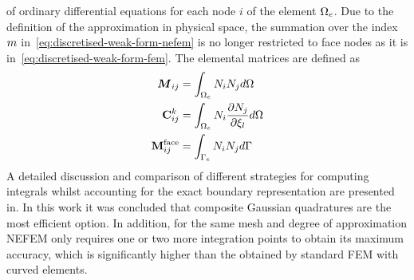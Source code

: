 of ordinary differential equations for each node $i$ of the element $\Omega_e$. Due to the definition of the approximation in physical space, the summation over the index $m$ in~\eqref{eq:discretised-weak-form-nefem} is no longer restricted to face nodes as it is in~\eqref{eq:discretised-weak-form-fem}. The elemental matrices are defined as
\begin{align*}
\boldsymbol{M}_{ij} &= \int_{\Omega_e} N_i N_j d\Omega \\
\mathbf{C}^{k}_{ij} &= 
               \int_{\Omega_e}
               N_i
               \frac{\partial N_j}{\partial \xi_{l}}
               d\Omega \\
\mathbf{M}^{\textrm{face}}_{ij} &= \int_{\Gamma_e} N_i N_j d\Gamma
\end{align*}
A detailed discussion and comparison of different strategies for computing integrals whilst accounting for the exact boundary representation are presented in\cite{DGPaper:38}. In this work it was concluded that composite Gaussian quadratures are the most efficient option. In addition, for the same mesh and degree of approximation NEFEM only requires one or two more integration points to obtain its maximum accuracy, which is significantly higher than the obtained by standard FEM with curved elements. 



